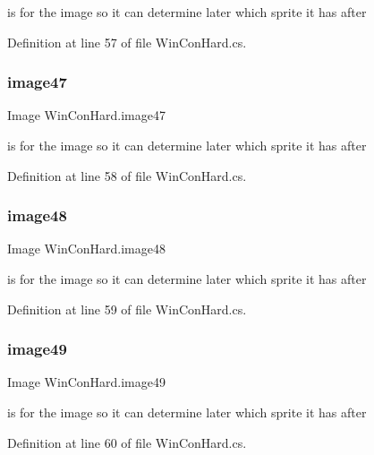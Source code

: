 is for the image so it can determine later which sprite it has after 

Definition at line 57 of file Win\+Con\+Hard.\+cs.

\mbox{\label{class_win_con_hard_a9fe29d059bbd1c04a4858bf4a6a97d3b}} 
\subsubsection{\texorpdfstring{image47}{image47}}
{\footnotesize\ttfamily Image Win\+Con\+Hard.\+image47}

is for the image so it can determine later which sprite it has after 

Definition at line 58 of file Win\+Con\+Hard.\+cs.

\mbox{\label{class_win_con_hard_aafe8e627fbb2c13f9c6df1665171789e}} 
\subsubsection{\texorpdfstring{image48}{image48}}
{\footnotesize\ttfamily Image Win\+Con\+Hard.\+image48}

is for the image so it can determine later which sprite it has after 

Definition at line 59 of file Win\+Con\+Hard.\+cs.

\mbox{\label{class_win_con_hard_aef1f591959921a08c15864014795b8f9}} 
\subsubsection{\texorpdfstring{image49}{image49}}
{\footnotesize\ttfamily Image Win\+Con\+Hard.\+image49}

is for the image so it can determine later which sprite it has after 

Definition at line 60 of file Win\+Con\+Hard.\+cs.

\mbox{\label{class_win_con_hard_ac07d21b9397afeaf8e33a2f708465229}} 
